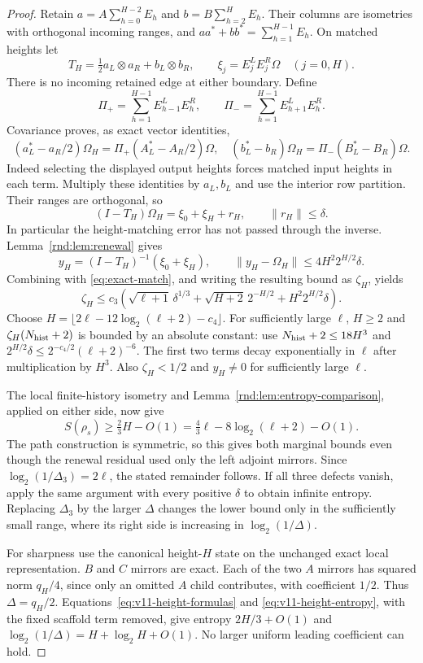 \begin{proof}
Retain $a=A\sum_{h=0}^{H-2}E_h$ and $b=B\sum_{h=2}^HE_h$. Their columns are isometries with orthogonal incoming ranges, and $aa^*+bb^*=\sum_{h=1}^{H-1}E_h$. On matched heights let
\[
 T_H=\tfrac12a_L\otimes a_R+b_L\otimes b_R,
 \qquad \xi_j=E_j^LE_j^R\Omega\quad(j=0,H).
\]
There is no incoming retained edge at either boundary. Define
\[
 \Pi_+=\sum_{h=1}^{H-1}E_{h-1}^LE_h^R,\qquad
 \Pi_-=\sum_{h=1}^{H-1}E_{h+1}^LE_h^R.
\]
Covariance proves, as exact vector identities,
\[
 (a_L^*-a_R/2)\Omega_H=\Pi_+(A_L^*-A_R/2)\Omega,
\quad
 (b_L^*-b_R)\Omega_H=\Pi_-(B_L^*-B_R)\Omega.
\]
Indeed selecting the displayed output heights forces matched input heights in each term. Multiply these identities by $a_L,b_L$ and use the interior row partition. Their ranges are orthogonal, so
\[
 (I-T_H)\Omega_H=\xi_0+\xi_H+r_H,
 \qquad\|r_H\|\le\delta.
\]
In particular the height-matching error has not passed through the inverse. Lemma~\ref{rnd:lem:renewal} gives
\[
 y_H=(I-T_H)^{-1}(\xi_0+\xi_H),\qquad
 \|y_H-\Omega_H\|\le4H^2 2^{H/2}\delta.
\]
Combining with \eqref{eq:exact-match}, and writing the resulting bound as $\zeta_H$, yields
\[
 \zeta_H\le c_3\left(
 \sqrt{\ell+1}\,\delta^{1/3}
 +\sqrt{H+2}\,2^{-H/2}
 +H^2 2^{H/2}\delta\right).
\]
Choose $H=\lfloor2\ell-12\log_2(\ell+2)-c_4\rfloor$. For sufficiently large $\ell$, $H\ge2$ and $\zeta_H(N_{\rm hist}+2)$ is bounded by an absolute constant: use $N_{\rm hist}+2\le18H^3$ and $2^{H/2}\delta\le2^{-c_4/2}(\ell+2)^{-6}$. The first two terms decay exponentially in $\ell$ after multiplication by $H^3$. Also $\zeta_H<1/2$ and $y_H\ne0$ for sufficiently large $\ell$.

The local finite-history isometry and Lemma~\ref{rnd:lem:entropy-comparison}, applied on either side, now give
\[
 S(\rho_s)\ge\tfrac23H-O(1)
 =\tfrac43\ell-8\log_2(\ell+2)-O(1).
\]
The path construction is symmetric, so this gives both marginal bounds even though the renewal residual used only the left adjoint mirrors. Since $\log_2(1/\Delta_3)=2\ell$, the stated remainder follows. If all three defects vanish, apply the same argument with every positive $\delta$ to obtain infinite entropy. Replacing $\Delta_3$ by the larger $\Delta$ changes the lower bound only in the sufficiently small range, where its right side is increasing in $\log_2(1/\Delta)$.

For sharpness use the canonical height-$H$ state on the unchanged exact local representation. $B$ and $C$ mirrors are exact. Each of the two $A$ mirrors has squared norm $q_H/4$, since only an omitted $A$ child contributes, with coefficient $1/2$. Thus $\Delta=q_H/2$. Equations~\eqref{eq:v11-height-formulas} and \eqref{eq:v11-height-entropy}, with the fixed scaffold term removed, give entropy $2H/3+O(1)$ and $\log_2(1/\Delta)=H+\log_2H+O(1)$. No larger uniform leading coefficient can hold.
\end{proof}

